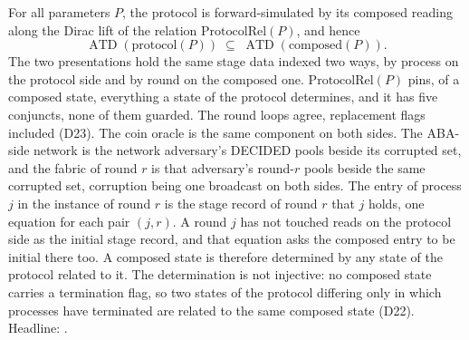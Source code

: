 \begin{theorem}
  \label{thm:aba-protocol-composed}
  \leanok
  For all parameters $P$, the protocol is forward-simulated by its composed reading along the Dirac lift of the relation $\mathrm{ProtocolRel}(P)$, and hence
  \[
    \operatorname{ATD}(\mathrm{protocol}(P)) \;\subseteq\;
    \operatorname{ATD}(\mathrm{composed}(P)).
  \]
  The two presentations hold the same stage data indexed two ways, by process on the protocol side and by round on the composed one.
  $\mathrm{ProtocolRel}(P)$ pins, of a composed state, everything a state of the protocol determines, and it has five conjuncts, none of them guarded.
  The round loops agree, replacement flags included (D23).
  The coin oracle is the same component on both sides.
  The ABA-side network is the network adversary's DECIDED pools beside its corrupted set, and the fabric of round $r$ is that adversary's round-$r$ pools beside the same corrupted set, corruption being one broadcast on both sides.
  The entry of process $j$ in the instance of round $r$ is the stage record of round $r$ that $j$ holds, one equation for each pair $(j,r)$.
  A round $j$ has not touched reads on the protocol side as the initial stage record, and that equation asks the composed entry to be initial there too.
  A composed state is therefore determined by any state of the protocol related to it.
  The determination is not injective: no composed state carries a termination flag, so two states of the protocol differing only in which processes have terminated are related to the same composed state (D22).
  Headline: .
\end{theorem}

